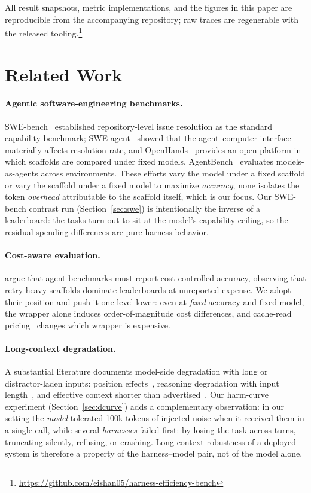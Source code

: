 \documentclass[11pt]{article}
\begin{document}
All result snapshots, metric implementations, and the figures in this paper are reproducible from the accompanying repository; raw traces are regenerable with the released tooling.\footnote{\url{https://github.com/eishan05/harness-efficiency-bench}}

\section{Related Work}
\label{sec:related}

\paragraph{Agentic software-engineering benchmarks.}
SWE-bench~\citep{jimenez2024swebench} established repository-level issue resolution as the standard capability benchmark; SWE-agent~\citep{yang2024sweagent} showed that the agent--computer interface materially affects resolution rate, and OpenHands~\citep{wang2024openhands} provides an open platform in which scaffolds are compared under fixed models. AgentBench~\citep{liu2024agentbench} evaluates models-as-agents across environments. These efforts vary the model under a fixed scaffold or vary the scaffold under a fixed model to maximize \emph{accuracy}; none isolates the token \emph{overhead} attributable to the scaffold itself, which is our focus. Our SWE-bench contrast run (Section~\ref{sec:swe}) is intentionally the inverse of a leaderboard: the tasks turn out to sit at the model's capability ceiling, so the residual spending differences are pure harness behavior.

\paragraph{Cost-aware evaluation.}
\citet{kapoor2024agents} argue that agent benchmarks must report cost-controlled accuracy, observing that retry-heavy scaffolds dominate leaderboards at unreported expense. We adopt their position and push it one level lower: even at \emph{fixed} accuracy and fixed model, the wrapper alone induces order-of-magnitude cost differences, and cache-read pricing~\citep{gim2024promptcache} changes which wrapper is expensive.

\paragraph{Long-context degradation.}
A substantial literature documents model-side degradation with long or distractor-laden inputs: position effects~\citep{liu2024lost}, reasoning degradation with input length~\citep{levy2024same}, and effective context shorter than advertised~\citep{hsieh2024ruler}. Our harm-curve experiment (Section~\ref{sec:dcurve}) adds a complementary observation: in our setting the \emph{model} tolerated 100k tokens of injected noise when it received them in a single call, while several \emph{harnesses} failed first: by losing the task across turns, truncating silently, refusing, or crashing. Long-context robustness of a deployed system is therefore a property of the harness--model pair, not of the model alone.
\end{document}
